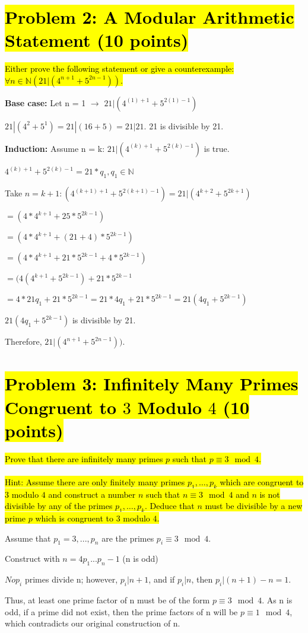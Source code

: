 \documentclass[12pt]{article}
\begin{document}
\section*{\hl{Problem 2: A Modular Arithmetic Statement (10 points)}}
\hl{Either prove the following statement or give a counterexample: $\forall n \in \mathbb{N} (21 | (4^{n+1} + 5^{2n-1}))$.}
\item \textbf{Base case:} Let n = 1 $\rightarrow$ $21 | (4^{(1)+1} + 5^{2(1)-1})$
\item[\rightarrow] $21 | (4^{2} + 5^{1}) = 21 | (16 + 5) = 21 | 21.$ 21 is divisible by 21.
\item \textbf{Induction:} Assume n = k: $21 | (4^{(k)+1} + 5^{2(k)-1})$ is true.
\item[\longrightarrow] $4^{(k)+1} + 5^{2(k)-1} = 21*q_{1}, q_1 \in \mathbb{N}$
\item Take $n = k+1: (4^{(k+1)+1} + 5^{2(k+1)-1}) = 21 | (4^{k+2} + 5^{2k+1}) $
\item $= (4*4^{k+1} + 25*5^{2k-1})$
\item $= (4*4^{k+1} + (21+4)*5^{2k-1})$
\item $= (4*4^{k+1} + 21*5^{2k-1}+4*5^{2k-1})$
\item $= (4(4^{k+1} + 5^{2k-1}) + 21*5^{2k-1}$
\item $= 4*21q_{1} + 21*5^{2k-1} = 21*4q_{1}+21*5^{2k-1} = 21(4q_{1}+5^{2k-1})$
\item $21(4q_{1}+5^{2k-1})$ is divisible by 21.
\item Therefore, $21 | (4^{n+1} + 5^{2n-1}))$.


\section*{\hl{Problem 3: Infinitely Many Primes Congruent to $3$ Modulo $4$ (10 
points)}}
\hl{Prove that there are infinitely many primes $p$ such that $p \equiv 3 \mod 4$.\\}
\\
\hl{Hint: Assume there are only finitely many primes $p_1,\ldots,p_k$ which are 
congruent to $3$ modulo $4$ and construct a number $n$ such that $n \equiv 3 \mod 
4$ and $n$ is not divisible by any of the primes $p_1,\ldots,p_k$. Deduce that $n$ 
must be divisible by a new prime $p$ which is congruent to $3$ modulo $4$.}

\item Assume that $p_1 = 3,...,p_{n}$ are the primes ${p_i} \equiv 3 \mod 4$.
\item Construct with $n = 4p_{1}...p_{n}-1$ (n is odd) \item \rightarrow $No p_{i}$ primes divide n; however, $p_i | n+1$, and if $p_{i} | n$, then $p_{i} | (n+1)-n = 1$.
\item Thus, at least one prime factor of n must be of the form $p \equiv 3 \mod 4$. As n is odd, if a prime did not exist, then the prime factors of n will be $p \equiv 1 \mod 4$, which contradicts our original construction of n. 
\end{document}
